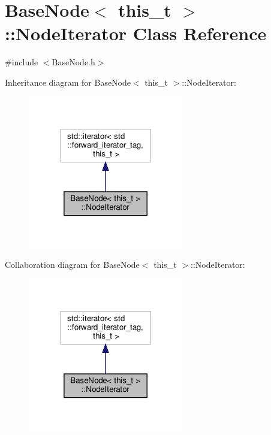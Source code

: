 \hypertarget{class_base_node_1_1_node_iterator}{}\section{Base\+Node$<$ this\+\_\+t $>$\+:\+:Node\+Iterator Class Reference}
\label{class_base_node_1_1_node_iterator}


{\ttfamily \#include $<$Base\+Node.\+h$>$}



Inheritance diagram for Base\+Node$<$ this\+\_\+t $>$\+:\+:Node\+Iterator\+:\nopagebreak
\begin{figure}[H]
\begin{center}
\leavevmode
\includegraphics[width=192pt]{class_base_node_1_1_node_iterator__inherit__graph}
\end{center}
\end{figure}


Collaboration diagram for Base\+Node$<$ this\+\_\+t $>$\+:\+:Node\+Iterator\+:\nopagebreak
\begin{figure}[H]
\begin{center}
\leavevmode
\includegraphics[width=192pt]{class_base_node_1_1_node_iterator__coll__graph}
\end{center}
\end{figure}
